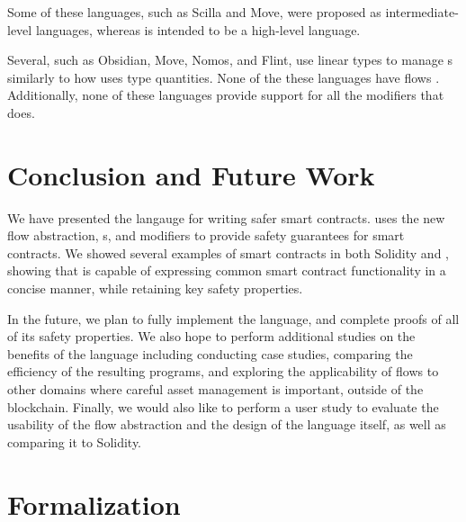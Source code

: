 \documentclass[dvipsnames, usenames, sigconf]{acmart}
\begin{document}
Some of these languages, such as Scilla and Move, were proposed as intermediate-level languages, whereas \langName is intended to be a high-level language.

Several, such as Obsidian, Move, Nomos, and Flint, use linear types to manage \assetTxt{}s similarly to how \langName uses type quantities.
None of the these languages have flows .
Additionally, none of these languages provide support for all the modifiers that \langName does.

\section{Conclusion and Future Work}

We have presented the \langName langauge for writing safer smart contracts.
\langName uses the new flow abstraction, \assetTxt{}s, and modifiers to provide safety guarantees for smart contracts.
We showed several examples of smart contracts in both Solidity and \langName, showing that \langName is capable of expressing common smart contract functionality in a concise manner, while retaining key safety properties.

In the future, we plan to fully implement the \langName language, and complete proofs of all of its safety properties.
We also hope to perform additional studies on the benefits of the language including conducting case studies, comparing the efficiency of the resulting programs, and exploring the applicability of flows to other domains where careful asset management is important, outside of the blockchain.
Finally, we would also like to perform a user study to evaluate the usability of the flow abstraction and the design of the language itself, as well as comparing it to Solidity.




\appendix
\section{Formalization}
\end{document}
